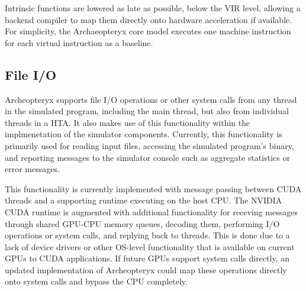 \documentclass[conference, 10pt]{IEEEtran}
\begin{document}
Intrinsic functions are lowered as late as possible, below the
VIR level, allowing a backend compiler to map them directly onto hardware
acceleration if available.  For simplicity, the Archaeopteryx core model
executes one machine instruction for each virtual instruction as a baseline.

%
%

\subsection{File I/O}
Archeopteryx supports file I/O operations or other system calls from any thread
in the simulated program, including the main thread, but also from individual
threads in a HTA.  It also makes use of this functionality within the
implmenetation of the simulator components. Currently, this functionality is
primarily used for reading input files, accessing the simulated program's
binary, and reporting messages to the simulator console such as aggregate
statistics or error messages. 

This functionality is currently implemented with message passing between
CUDA threads and a supporting runtime executing on the host CPU.  The NVIDIA
CUDA runtime is augmented with additional functionality for receving messages
through shared GPU-CPU memory queues, decoding them, performing I/O operations
or system calls, and replying back to threads.  This is done due to a lack of
device drivers or other OS-level functionality that is available on current GPUs
to CUDA applications. If future GPUs support system calls directly, an updated
implementation of Archeopteryx could map these operations directly onto system
calls and bypass the CPU completely.



\end{document}
